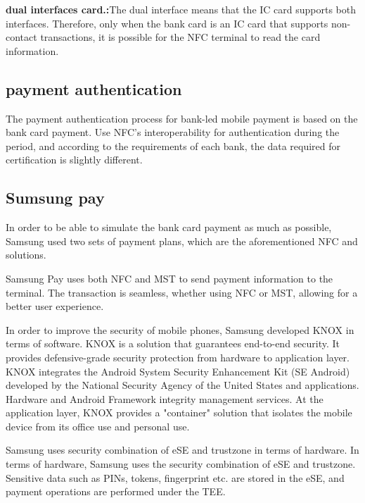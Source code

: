\documentclass[journal]{IEEEtran}
\begin{document}
\textbf{dual interfaces card.:}The dual interface means that the IC card supports both interfaces. Therefore, only when the bank card is an IC card that supports non-contact transactions, it is possible for the NFC terminal to read the card information.

\subsection{payment authentication}
The payment authentication process for bank-led mobile payment is based on the bank card payment. Use NFC's interoperability for authentication during the period, and according to the requirements of each bank, the data required for certification is slightly different.




\subsection{Sumsung pay}
In order to be able to simulate the bank card payment as much as possible, Samsung used two sets of payment plans, which are the aforementioned NFC and solutions.

Samsung Pay uses both NFC and MST to send payment information to the terminal. The transaction is seamless, whether using NFC or MST, allowing for a better user experience.

In order to improve the security of mobile phones, Samsung developed KNOX in terms of software. KNOX is a solution that guarantees end-to-end security. It provides defensive-grade security protection from hardware to application layer. KNOX integrates the Android System Security Enhancement Kit (SE Android) developed by the National Security Agency of the United States and applications. Hardware and Android Framework integrity management services. At the application layer, KNOX provides a "container" solution that isolates the mobile device from its office use and personal use.

Samsung uses security combination of eSE and trustzone in terms of hardware. In terms of hardware, Samsung uses the security combination of eSE and trustzone. Sensitive data such as PINs, tokens, fingerprint etc. are stored in the eSE, and payment operations are performed under the TEE.
\end{document}
